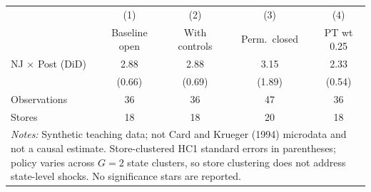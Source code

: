\begin{tabular}{lcccc}
\toprule
 & (1) & (2) & (3) & (4) \\
 & Baseline open & With controls & Perm.\ closed & PT wt 0.25 \\
\midrule
NJ $\times$ Post (DiD) & 2.88 & 2.88 & 3.15 & 2.33 \\
 & (0.66) & (0.69) & (1.89) & (0.54) \\
\midrule
Observations & 36 & 36 & 47 & 36 \\
Stores & 18 & 18 & 20 & 18 \\
\bottomrule
\multicolumn{5}{p{0.94\linewidth}}{\footnotesize \textit{Notes:} Synthetic teaching data; not Card and Krueger (1994) microdata and not a causal estimate. Store-clustered HC1 standard errors in parentheses; policy varies across $G=2$ state clusters, so store clustering does not address state-level shocks. No significance stars are reported.} \\
\end{tabular}
